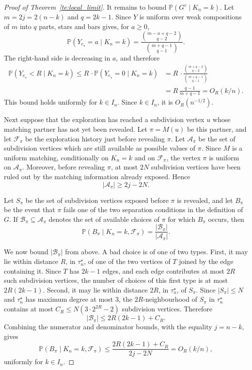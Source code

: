 \documentclass[english,11pt]{smfart}
\newcommand{\Prb}[1]{\mathbb{P}\left(#1\right)}
\newcommand{\cA}{\mathcal{A}}
\numberwithin{equation}{section}
\begin{document}
\begin{proof}[Proof of Theorem~\ref{te:local_limit}]
\smallskip
It remains to bound \(\Prb{G^c\mid K_n=k}\). Let \(m=2j=2(n-k)\) and
\(q=2k-1\). Since \(Y\) is uniform over weak compositions of \(m\) into \(q\)
parts, stars and bars gives, for \(a\ge0\),
\[
  \Prb{Y_{e_\star}=a\mid K_n=k}
  =
  \frac{\binom{m-a+q-2}{q-2}}{\binom{m+q-1}{q-1}} .
\]
The right-hand side is decreasing in \(a\), and therefore
\begin{align*}
  \Prb{Y_{e_\star}<R\mid K_n=k}
  \le
  R\, \cdot \Prb{Y_{e_\star}=0\mid K_n=k}
  &=
  R\, \cdot \frac{\binom{m+q-2}{q-2}}{\binom{m+q-1}{q-1}}  \\
  &=
  R\,\frac{q-1}{m+q-1}
  =
  O_R(k/n).
\end{align*}
This bound holds uniformly for \(k\in I_n\). Since \(k\in I_n\), it is
\(O_R(n^{-1/2})\).

\smallskip
Next suppose that the exploration has reached a subdivision vertex \(u\) whose
matching partner has not yet been revealed. Let \(\pi=M(u)\) be this partner,
and let \(\mathcal F_\pi\) be the exploration history just before revealing
\(\pi\). Let \(\cA_\pi\) be the set of subdivision vertices which are
still available as possible values of \(\pi\). Since \(M\) is a uniform
matching, conditionally on \(K_n=k\) and on \(\mathcal F_\pi\), the vertex
\(\pi\) is uniform on \(\cA_\pi\). Moreover, before revealing \(\pi\),
at most \(2N\) subdivision vertices have been ruled out by the matching
information already exposed. Hence
\[
  |\cA_\pi|\ge 2j-2N .
\]

\smallskip
Let \(S_\pi\) be the set of subdivision vertices exposed before \(\pi\) is
revealed, and let \(B_\pi\) be the event that \(\pi\) fails one of the two
separation conditions in the definition of \(G\). If \(\mathcal B_\pi\subseteq
\cA_\pi\) denotes the set of available choices of \(\pi\) for which
\(B_\pi\) occurs, then
\[
  \Prb{B_\pi\mid K_n=k,\mathcal F_\pi}
  =
  \frac{|\mathcal B_\pi|}{|\cA_\pi|}.
\]

\smallskip
We now bound \(|\mathcal B_\pi|\) from above. A bad choice is of one of two
types. First, it may lie within distance \(R\), in \(\tau_n^{\star}\), of one of the
two vertices of \(T\) joined by the edge containing it. Since \(T\) has
\(2k-1\) edges, and each edge contributes at most \(2R\) such subdivision
vertices, the number of choices of this first type is at most \(2R(2k-1)\).
Second, it may lie within distance \(2R\), in \(\tau_n^{\star}\), of \(S_\pi\). Since
\(|S_\pi|\le N\) and \(\tau_n^{\star}\) has maximum degree at most \(3\), the
\(2R\)-neighbourhood of \(S_\pi\) in \(\tau_n^{\star}\) contains at most
\(C_R \leq N(3\cdot 2^{2R}-2)\) subdivision vertices. Therefore
\[
  |\mathcal B_\pi|
  \le
  2R(2k-1)+C_R .
\]
Combining the numerator and denominator bounds, with the equality $j=n-k$, gives
\[
  \Prb{B_\pi\mid K_n=k,\mathcal F_\pi}
  \le
  \frac{2R(2k-1)+C_R}{2j-2N}
  =
  O_R(k/n),
\]
uniformly for \(k\in I_n\).


\end{proof}
\end{document}
